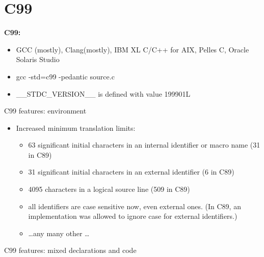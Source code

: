 \section{C99}
\begin{frame}{}
    \begin{block}{ \begin{Huge} \textbf{C99:} \end{Huge}}
        \bigskip
        \bigskip
        \bigskip
        \begin{itemize}
            \item GCC (mostly), Clang(mostly), IBM XL C/C++ for AIX, Pelles C, Oracle Solaris Studio
            \pause\item gcc -std=c99 -pedantic source.c
            \pause\item \_\_STDC\_VERSION\_\_ is defined with value 199901L
        \end{itemize}
        \bigskip
        \bigskip
        \bigskip
    \end{block}
\end{frame}
\begin{frame}{C99 features: environment}
    \begin{itemize}
        \item Increased minimum translation limits: \\
        \begin{itemize}
            \item 63 significant initial characters in an internal identifier or macro name (31 in C89)
            \item 31 significant initial characters in an external identifier (6 in C89)
            \item 4095 characters in a logical source line (509 in C89)
            \item all identifiers are case sensitive now, even external ones. (In C89, an implementation was allowed to ignore case for external identifiers.)
            \item \ldots any many other \ldots
        \end{itemize}
    \end{itemize}
\end{frame}
\begin{frame}{C99 features: mixed declarations and code}
    
\end{frame}
